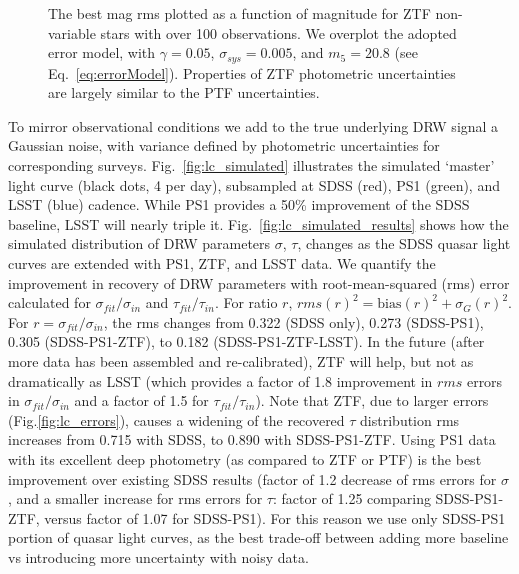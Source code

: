 \documentclass[twocolumn]{aastex62}
\begin{document}
\begin{figure}
	\caption{The best mag rms plotted as a function of magnitude for ZTF non-variable stars with over 100 observations. We overplot the adopted error model, with $\gamma = 0.05$, $\sigma_{sys} = 0.005 $, and $m_{5} = 20.8$ (see Eq.~\ref{eq:errorModel}). Properties of ZTF photometric uncertainties are largely similar to the PTF uncertainties.}
	\label{fig:ztf_errors}
\end{figure} 


\begin{figure*}
	\caption{Simulated well-sampled underlying DRW process - one of `master' light curves ($\tau=575$d, SF$_{\infty} = 0.2$ mag, 4 points per day) shown with  small black dots. To simulate observations, the cadence is degraded (subsampled) to match the ground-based cadence corresponding to real quasar data from SDSS (red), PS1 (green) segments, and simulated LSST (blue) epochs (here we use SDSS-PS1 epochs for quasar dbID=3537034). The orange `error snake' is an envelope marking the standard deviation of the fit to the data using a Gaussian process  with DRW kernel (Sec.~\ref{sec:simulation}).}
	\label{fig:lc_simulated}
\end{figure*} 



To mirror observational conditions we add to the true underlying DRW signal a Gaussian noise, with variance defined by photometric uncertainties for corresponding surveys. Fig.~\ref{fig:lc_simulated} illustrates the simulated `master' light curve (black dots, 4 per day), subsampled at SDSS (red), PS1 (green), and LSST (blue) cadence. While PS1 provides a 50\% improvement of the SDSS baseline, LSST will nearly triple it. Fig.~\ref{fig:lc_simulated_results} shows how the simulated distribution of DRW parameters $\sigma$, $\tau$, changes as the SDSS quasar light curves are extended with PS1, ZTF, and LSST data. We quantify the improvement in recovery of DRW parameters with root-mean-squared (rms) error calculated for $\sigma_{fit}/\sigma_{in}$ and $\tau_{fit} / \tau_{in}$. For ratio $r$,  $rms(r)^{2} = \mathrm{bias}(r)^{2} + \sigma_{G}(r)^{2}$. For $r=\sigma_{fit}/\sigma_{in}$, the rms changes from 0.322 (SDSS only),  0.273  (SDSS-PS1), 0.305 (SDSS-PS1-ZTF), to 0.182 (SDSS-PS1-ZTF-LSST). In the future (after more data has been assembled and re-calibrated), ZTF will help, but not as dramatically as LSST (which provides a factor of 1.8 improvement in $rms$ errors in $\sigma_{fit}/\sigma_{in}$ and a factor of 1.5 for $\tau_{fit} / \tau_{in}$). Note that ZTF, due to larger errors (Fig.\ref{fig:lc_errors}), causes a widening of the recovered $\tau$ distribution rms increases from 0.715 with SDSS, to 0.890 with SDSS-PS1-ZTF. Using PS1 data with its excellent  deep photometry (as compared to ZTF or PTF) is the best improvement over existing SDSS results (factor of 1.2 decrease of rms errors for $\sigma$, and a smaller increase for rms errors for $\tau$: factor of 1.25 comparing SDSS-PS1-ZTF, versus factor of 1.07 for SDSS-PS1). For this reason we use only SDSS-PS1 portion of quasar light curves, as the best trade-off between adding more baseline vs introducing more uncertainty with noisy data.
\end{document}
